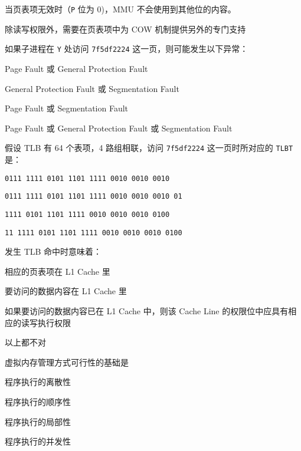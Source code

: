 \begin{problems}
\begin{choices}
                \item 当页表项无效时（\verb|P| 位为 0)，MMU 不会使用到其他位的内容。
                \item 除读写权限外，需要在页表项中为 COW 机制提供另外的专门支持
            \end{choices}
            \subqn 如果子进程在 \verb|Y| 处访问 \verb|7f5df2224| 这一页，则可能发生以下异常：
            \begin{choices}
                \item Page Fault 或 General Protection Fault
                \item General Protection Fault 或 Segmentation Fault
                \item Page Fault 或 Segmentation Fault
                \item Page Fault 或 General Protection Fault 或 Segmentation Fault
            \end{choices}
            \subqn 假设 TLB 有 64 个表项，4 路组相联，访问 \verb|7f5df2224| 这一页时所对应的 \verb|TLBT| 是：
            \begin{choices}
                \item \verb|0111 1111 0101 1101 1111 0010 0010 0010|
                \item \verb|0111 1111 0101 1101 1111 0010 0010 0010 01|
                \item \verb|1111 0101 1101 1111 0010 0010 0010 0100|
                \item \verb|11 1111 0101 1101 1111 0010 0010 0010 0100|
            \end{choices}
            \subqn 发生 TLB 命中时意味着：
            \begin{choices}
                \item 相应的页表项在 L1 Cache 里
                \item 要访问的数据内容在 L1 Cache 里
                \item 如果要访问的数据内容已在 L1 Cache 中，则该 Cache Line 的权限位中应具有相应的读写执行权限
                \item 以上都不对
            \end{choices}
         虚拟内存管理方式可行性的基础是
        \begin{choices}
            \item 程序执行的离散性
            \item 程序执行的顺序性
            \item 程序执行的局部性
            \item 程序执行的并发性

\end{choices}
\end{problems}
